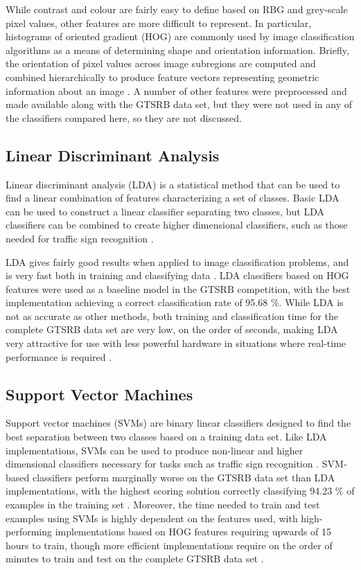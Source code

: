 \documentclass[letterpaper,twocolumn,10pt]{article}
\begin{document}
While contrast and colour are fairly easy to define based on RBG and grey-scale pixel values, other features are more difficult to represent. In particular, histograms of oriented gradient (HOG) are commonly used by image classification algorithms as a means of determining shape and orientation information. Briefly, the orientation of pixel values across image subregions are computed and combined hierarchically to produce feature vectors representing geometric information about an image \cite{stallkamp_german_2011, stallkamp_man_2012}. A number of other features were preprocessed and made available along with the GTSRB data set, but they were not used in any of the classifiers compared here, so they are not discussed.


\subsection{Linear Discriminant Analysis}

Linear discriminant analysis (LDA) is a statistical method that can be used to find a linear combination of features characterizing a set of classes. Basic LDA can be used to construct a linear classifier separating two classes, but LDA classifiers can be combined to create higher dimensional classifiers, such as those needed for traffic sign recognition \cite{xanthopoulos2013linear}.

LDA gives fairly good results when applied to image classification problems, and is very fast both in training and classifying data \cite{hastie2001linear, mathias_traffic_2013}. LDA classifiers based on HOG features were used as a baseline model in the GTSRB competition, with the best implementation achieving a correct classification rate of 95.68 \%. While LDA is not as accurate as other methods, both training and classification time for the complete GTSRB data set are very low, on the order of seconds, making LDA very attractive for use with less powerful hardware in situations where real-time performance is required \cite{mathias_traffic_2013}.

\subsection{Support Vector Machines}

Support vector machines (SVMs) are binary linear classifiers designed to find the best separation between two classes based on a training data set. Like LDA implementations, SVMs can be used to produce non-linear and higher dimensional classifiers necessary for tasks such as traffic sign recognition \cite{mathias_traffic_2013}. SVM-based classifiers perform marginally worse on the GTSRB data set than LDA implementations, with the highest scoring solution correctly classifying 94.23 \% of examples in the training set \cite{mathias_traffic_2013}. Moreover, the time needed to train and test examples using SVMs is highly dependent on the features used, with high-performing implementations based on HOG features requiring upwards of 15 hours to train, though more efficient implementations require on the order of minutes to train and test on the complete GTSRB data set \cite{mathias_traffic_2013, stallkamp_german_2011}. 
\end{document}

